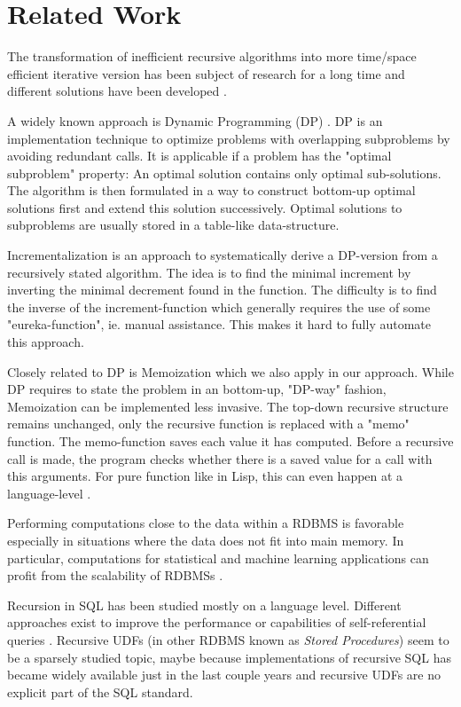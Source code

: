 \section{Related Work}

The transformation of inefficient recursive algorithms into more time/space efficient iterative version has been subject of research for a long time and different solutions have been developed \cite{redundantRecRemoval, transformingRecProgs, recursionRemoval, changeEvalOrder, programTransformation}.

A widely known approach is Dynamic Programming (DP) \cite{DP_Bellman}. DP is an implementation technique to optimize problems with overlapping subproblems by avoiding redundant calls. It is applicable if a problem has the "optimal subproblem" property: An optimal solution contains only optimal sub-solutions. The algorithm is then formulated in a way to construct bottom-up optimal solutions first and extend this solution successively. Optimal solutions to subproblems are usually stored in a table-like data-structure. \cite[p. 363 ff.]{Cormen}

Incrementalization is an approach to systematically derive a DP-version from a recursively stated algorithm. The idea is to find the minimal increment by inverting the minimal decrement found in the function. The difficulty is to find the inverse of the increment-function which generally requires the use of some "eureka-function", ie. manual assistance. This makes it hard to fully automate this approach. \cite{incrementalization}

Closely related to DP is Memoization \cite{memo} which we also apply in our approach. While DP requires to state the problem in an bottom-up, "DP-way" fashion, Memoization can be implemented less invasive. The top-down recursive structure remains unchanged, only the recursive function is replaced with a "memo" function. The memo-function saves each value it has computed. Before a recursive call is made, the program checks whether there is a saved value for a call with this arguments. For pure function like in Lisp, this can even happen at a language-level \cite{norvig_memoization}. \cite[p. 390 ff.]{Cormen}

Performing computations close to the data within a RDBMS is favorable especially in situations where the data does not fit into main memory. In particular, computations for statistical and machine learning applications can profit from the scalability of RDBMSs \cite{SQLforML,PCAinSQL,MLwithUDFs,MLinSQL2,decisionTables}.

Recursion in SQL has been studied mostly on a language level. Different approaches exist to improve the performance or capabilities of self-referential queries \cite{LRoptimizations, optimizingRecursiveQueries, extendingRecursionInSQL, RCTEplanningOptimization}. Recursive UDFs (in other RDBMS known as \textit{Stored Procedures}) seem to be a sparsely studied topic, maybe because implementations of recursive SQL has became widely available just in the last couple years \cite{RSQLsurvey} and recursive UDFs are no explicit part of the SQL standard.